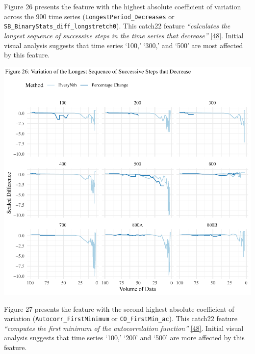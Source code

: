 \documentclass{article}
\begin{document}
Figure 26 presents the feature with the highest absolute coefficient of
variation across the 900 time series (\texttt{LongestPeriod\_Decreases}
or \texttt{SB\_BinaryStats\_diff\_longstretch0}). This catch22 feature
\emph{``calculates the longest sequence of successive steps in the time
series that decrease''} \protect\hyperlink{ref-feature_book}{{[}48{]}}.
Initial visual analysis suggests that time series `100,' `300,' and
`500' are most affected by this feature.

\includegraphics{210431461_CSC8639_Dissertation_files/figure-latex/LongestDecrease-1.pdf}

\newpage

Figure 27 presents the feature with the second highest absolute
coefficient of variation (\texttt{Autocorr\_FirstMinimum} or
\texttt{CO\_FirstMin\_ac}). This catch22 feature \emph{``computes the
first minimum of the autocorrelation function''}
\protect\hyperlink{ref-feature_book}{{[}48{]}}. Initial visual analysis
suggests that time series `100,' `200' and `500' are more affected by
this feature.
\end{document}
